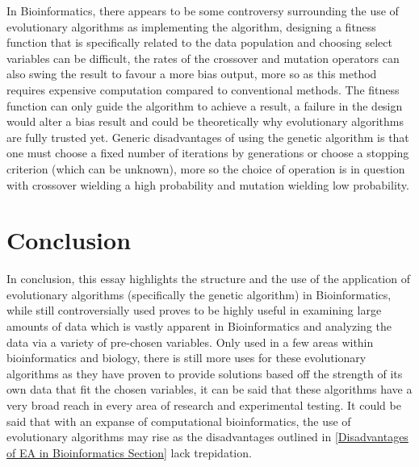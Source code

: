 \documentclass[12pt]{article}
\begin{document}
In Bioinformatics, there appears to be some controversy surrounding the use of evolutionary algorithms as implementing the algorithm, designing a fitness function that is specifically related to the data population and choosing select variables can be difficult, the rates of the crossover and mutation operators can also swing the result to favour a more bias output, more so as this method requires expensive computation compared to conventional methods. The fitness function can only guide the algorithm to achieve a result, a failure in the design would alter a bias result and could be theoretically why evolutionary algorithms are fully trusted yet. Generic disadvantages of using the genetic algorithm is that one must choose a fixed number of iterations by generations or choose a stopping criterion (which can be unknown), more so the choice of operation is in question with crossover wielding a high probability and mutation wielding low probability.
\section{Conclusion}
\label{Conclusion Section}
In conclusion, this essay highlights the structure and the use of the application of evolutionary algorithms (specifically the genetic algorithm) in Bioinformatics, while still controversially used proves to be highly useful in examining large amounts of data which is vastly apparent in Bioinformatics and analyzing the data via a variety of pre-chosen variables. Only used in a few areas within bioinformatics and biology, there is still more uses for these evolutionary algorithms as they have proven to provide solutions based off the strength of its own data that fit the chosen variables, it can be said that these algorithms have a very broad reach in every area of research and experimental testing. It could be said that with an expanse of computational bioinformatics, the use of evolutionary algorithms may rise as the disadvantages outlined in \cref{Disadvantages of EA in Bioinformatics Section} lack trepidation.
\newpage


\end{document}
